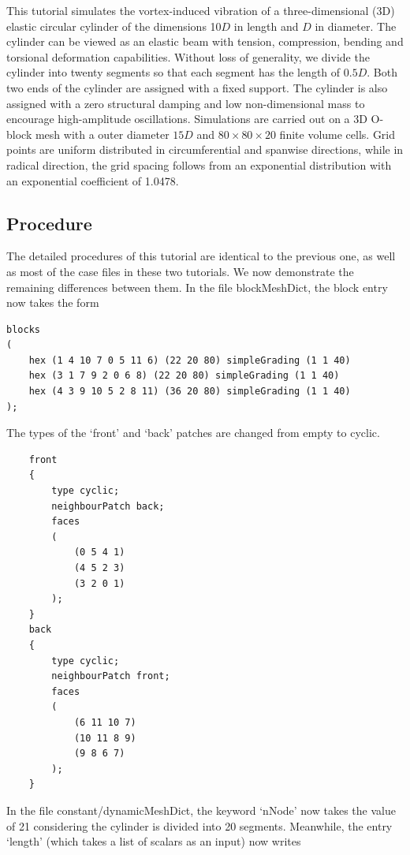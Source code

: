 This tutorial simulates the vortex-induced vibration of a three-dimensional (3D) elastic circular cylinder of the dimensions 10$D$ in length and $D$ in diameter. The cylinder can be viewed as an elastic beam with tension, compression, bending and torsional deformation capabilities. Without loss of generality, we divide the cylinder into twenty segments so that each segment has the length of $0.5D$. Both two ends of the cylinder are assigned with a fixed support. The cylinder is also assigned with a zero structural damping and low non-dimensional mass to encourage high-amplitude oscillations. Simulations are carried out on a 3D O-block mesh with a outer diameter $15D$ and $80\times80\times20$ finite volume cells. Grid points are uniform distributed in circumferential and spanwise directions, while in radical direction, the grid spacing follows from an exponential distribution with an exponential coefficient of 1.0478. 

\subsection{Procedure}

The detailed procedures of this tutorial are identical to the previous one, as well as most of the case files in these two tutorials. We now demonstrate the remaining differences between them. In the file blockMeshDict, the block entry now takes the form 

\begin{lstlisting}
blocks
(
    hex (1 4 10 7 0 5 11 6) (22 20 80) simpleGrading (1 1 40)
    hex (3 1 7 9 2 0 6 8) (22 20 80) simpleGrading (1 1 40)
    hex (4 3 9 10 5 2 8 11) (36 20 80) simpleGrading (1 1 40)
);
\end{lstlisting}

\noindent The types of the `front' and `back' patches are changed from empty to cyclic.

\begin{lstlisting}
    front
    {
        type cyclic;
        neighbourPatch back;
        faces
        (
            (0 5 4 1)
            (4 5 2 3)
            (3 2 0 1)
        );
    }
    back
    {
        type cyclic;
        neighbourPatch front;
        faces
        (
            (6 11 10 7)
            (10 11 8 9)
            (9 8 6 7)
        );
    }
\end{lstlisting}

\noindent In the file constant/dynamicMeshDict, the keyword `nNode' now takes the value of 21 considering the cylinder is divided into 20 segments. Meanwhile, the entry `length' (which takes a list of scalars as an input) now writes

